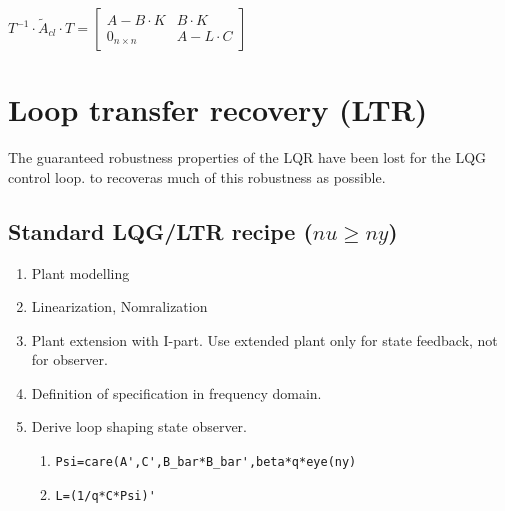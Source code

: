 \documentclass[10pt,a4paper]{scrartcl}
\begin{document}
\begin{multicols*}{3}
	$T^{-1}\cdot \tilde{A}_{cl}\cdot T = \begin{bmatrix}A-B\cdot K & B\cdot K\\0_{n\times n}&A-L\cdot C\end{bmatrix}$
	
	\finn
	
	
	
	
	\section[LTR]{Loop transfer recovery (LTR)}
	
	The guaranteed robustness properties of the LQR have been lost for the LQG control loop.  to \glqq recover\grqq as much of this robustness as possible.
	
	
	\subsection*{Standard LQG/LTR recipe ($nu\geq ny$)}
	
	\begin{enumerate}[leftmargin=*]
	\compaq
	\item
	Plant modelling
	\item
	Linearization, Nomralization
	\item
	Plant extension with I-part. Use extended plant only for state feedback, not for observer.
	\item
	Definition of specification in frequency domain.
	\item
	Derive loop shaping state observer.
		
	\begin{enumerate}[leftmargin=*]
	\compaq
	\item
	\verb+Psi=care(A',C',B_bar*B_bar',beta*q*eye(ny)+	
	\item

	\verb+L=(1/q*C*Psi)'+


\end{enumerate}
\end{enumerate}
\end{multicols*}
\end{document}
